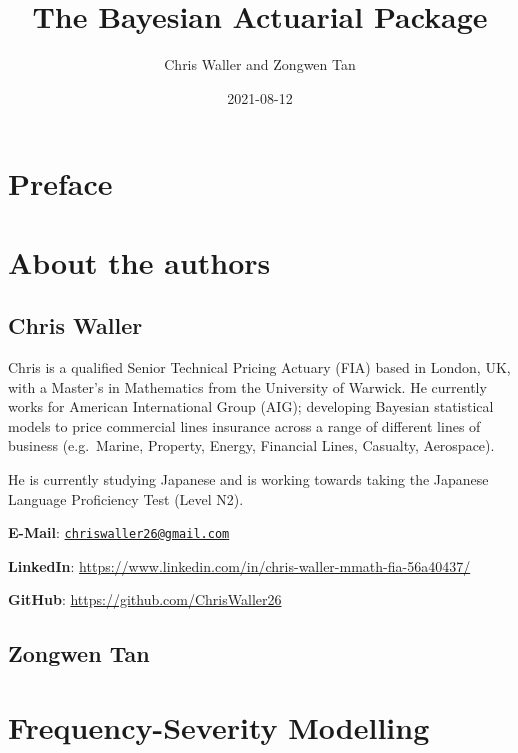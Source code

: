\documentclass[
]{book}
\title{The Bayesian Actuarial Package}
\author{Chris Waller and Zongwen Tan}
\date{2021-08-12}
\begin{document}
\maketitle

{
\setcounter{tocdepth}{1}
\tableofcontents
}
\hypertarget{preface}{%
\chapter{Preface}\label{preface}}

\hypertarget{about-the-authors}{%
\chapter{About the authors}\label{about-the-authors}}

\hypertarget{chris-waller}{%
\section{Chris Waller}\label{chris-waller}}

Chris is a qualified Senior Technical Pricing Actuary (FIA) based in London, UK, with a Master's in Mathematics from the University of Warwick. He currently works for American International Group (AIG); developing Bayesian statistical models to price commercial lines insurance across a range of different lines of business (e.g.~Marine, Property, Energy, Financial Lines, Casualty, Aerospace).

He is currently studying Japanese and is working towards taking the Japanese Language Proficiency Test (Level N2).

\textbf{E-Mail}: \href{mailto:chriswaller26@gmail.com}{\nolinkurl{chriswaller26@gmail.com}}

\textbf{LinkedIn}: \url{https://www.linkedin.com/in/chris-waller-mmath-fia-56a40437/}

\textbf{GitHub}: \url{https://github.com/ChrisWaller26}

\hypertarget{zongwen-tan}{%
\section{Zongwen Tan}\label{zongwen-tan}}

\hypertarget{frequency-severity-modelling}{%
\chapter{Frequency-Severity Modelling}\label{frequency-severity-modelling}}
\end{document}
